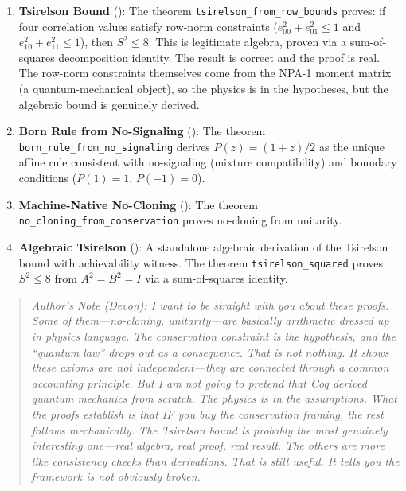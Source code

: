 \begin{enumerate}
    \item \textbf{Tsirelson Bound} (): The theorem \texttt{tsirelson\_from\_row\_bounds} proves: if four correlation values satisfy row-norm constraints ($e_{00}^2 + e_{01}^2 \leq 1$ and $e_{10}^2 + e_{11}^2 \leq 1$), then $S^2 \leq 8$. This is legitimate algebra, proven via a sum-of-squares decomposition identity. The result is correct and the proof is real. The row-norm constraints themselves come from the NPA-1 moment matrix (a quantum-mechanical object), so the physics is in the hypotheses, but the algebraic bound is genuinely derived.
    
    \item \textbf{Born Rule from No-Signaling} (): The theorem \texttt{born\_rule\_from\_no\_signaling} derives $P(z) = (1+z)/2$ as the unique affine rule consistent with no-signaling (mixture compatibility) and boundary conditions ($P(1)=1$, $P(-1)=0$).

    \item \textbf{Machine-Native No-Cloning} (): The theorem \texttt{no\_cloning\_from\_conservation} proves no-cloning from unitarity.
    
    \item \textbf{Algebraic Tsirelson} (): A standalone algebraic derivation of the Tsirelson bound with achievability witness. The theorem \texttt{tsirelson\_squared} proves $S^2 \leq 8$ from $A^2 = B^2 = I$ via a sum-of-squares identity.
\end{enumerate}

\begin{quote}
\textit{Author's Note (Devon): I want to be straight with you about these proofs. Some of them---no-cloning, unitarity---are basically arithmetic dressed up in physics language. The conservation constraint is the hypothesis, and the ``quantum law'' drops out as a consequence. That is not nothing. It shows these axioms are not independent---they are connected through a common accounting principle. But I am not going to pretend that Coq derived quantum mechanics from scratch. The physics is in the assumptions. What the proofs establish is that IF you buy the conservation framing, the rest follows mechanically. The Tsirelson bound is probably the most genuinely interesting one---real algebra, real proof, real result. The others are more like consistency checks than derivations. That is still useful. It tells you the framework is not obviously broken.}
\end{quote}

